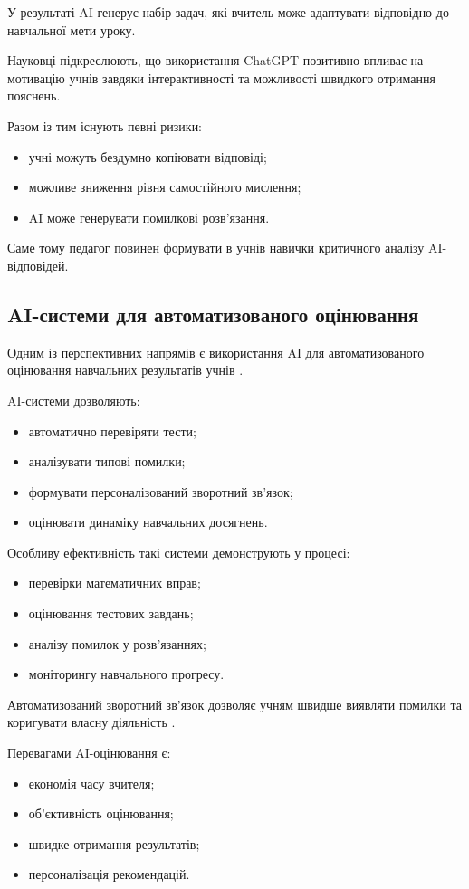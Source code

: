 У результаті AI генерує набір задач, які вчитель може адаптувати відповідно до навчальної мети уроку.

Науковці \cite{Taani20251748} підкреслюють, що використання ChatGPT позитивно впливає на мотивацію учнів завдяки інтерактивності та можливості швидкого отримання пояснень.

Разом із тим існують певні ризики:
\begin{itemize}
\item учні можуть бездумно копіювати відповіді;
\item можливе зниження рівня самостійного мислення;
\item AI може генерувати помилкові розв’язання.
\end{itemize}

Саме тому педагог повинен формувати в учнів навички критичного аналізу AI-відповідей.

\subsection{AI-системи для автоматизованого оцінювання}

Одним із перспективних напрямів є використання AI для автоматизованого оцінювання навчальних результатів учнів \cite{Walkington2025,Jacobs2022}.

AI-системи дозволяють:
\begin{itemize}
\item автоматично перевіряти тести;
\item аналізувати типові помилки;
\item формувати персоналізований зворотний зв’язок;
\item оцінювати динаміку навчальних досягнень.
\end{itemize}

Особливу ефективність такі системи демонструють у процесі:
\begin{itemize}
\item перевірки математичних вправ;
\item оцінювання тестових завдань;
\item аналізу помилок у розв’язаннях;
\item моніторингу навчального прогресу.
\end{itemize}

Автоматизований зворотний зв’язок дозволяє учням швидше виявляти помилки та коригувати власну діяльність \cite{Rezat2021}.

Перевагами AI-оцінювання є:
\begin{itemize}
\item економія часу вчителя;
\item об’єктивність оцінювання;
\item швидке отримання результатів;
\item персоналізація рекомендацій.
\end{itemize}

